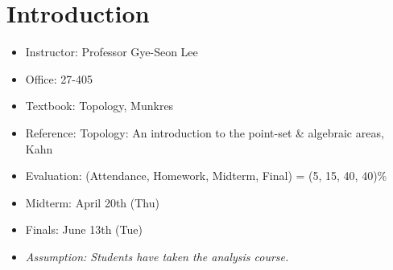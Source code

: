 \section*{Introduction}

\begin{itemize}
    \item Instructor: Professor Gye-Seon Lee
    \item Office: 27-405
    \item Textbook: Topology, Munkres
    \item Reference: Topology: An introduction to the point-set \& algebraic areas, Kahn
    \item Evaluation: (Attendance, Homework, Midterm, Final) = (5, 15, 40, 40)\%
    \item Midterm: April 20th (Thu)
    \item Finals: June 13th (Tue)
    \item \textit{Assumption: Students have taken the analysis course.}
\end{itemize}

\pagebreak
